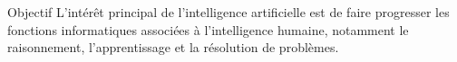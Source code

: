 \begin{frame}{Objectif}
L’intérêt principal de l’intelligence artificielle est de faire progresser les
fonctions informatiques associées à l’intelligence humaine, notamment le
raisonnement, l’apprentissage et la résolution de problèmes.
\end{frame}
